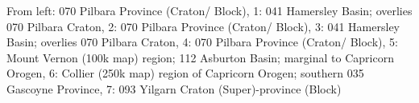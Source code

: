 From left: 070 Pilbara Province (Craton/ Block), 1: 041 Hamersley Basin; overlies 070 Pilbara Craton, 2: 070 Pilbara Province (Craton/ Block), 3: 041 Hamersley Basin; overlies 070 Pilbara Craton, 4: 070 Pilbara Province (Craton/ Block), 5: Mount Vernon (100k map) region; 112 Asburton Basin; marginal to Capricorn Orogen, 6: Collier (250k map) region of Capricorn Orogen; southern 035 Gascoyne Province, 7: 093 Yilgarn Craton (Super)-province (Block)
